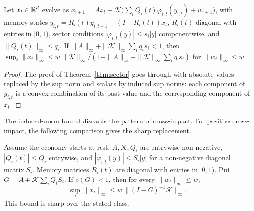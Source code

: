 \begin{proposition}\label{prop:multiasset}
Let $x_t\in\mathbb{R}^d$ evolve as $x_{t+1}=Ax_t+\mathcal K\bigl(\sum_iQ_i(t)\varphi_{i,t}(y_{i,t})+w_{t+1}\bigr)$, with memory states $y_{i,t}=R_i(t)y_{i,t-1}+(I-R_i(t))x_t$, $R_i(t)$ diagonal with entries in $[0,1)$, sector conditions $|\varphi_{i,t}(y)|\le s_i|y|$ componentwise, and $\|Q_i(t)\|_\infty\le\bar q_i$. If $\|A\|_\infty+\|\mathcal K\|_\infty\sum_i\bar q_is_i<1$, then $\sup_t\|x_t\|_\infty\le\bar w\,\|\mathcal K\|_\infty/(1-\|A\|_\infty-\|\mathcal K\|_\infty\sum_i\bar q_is_i)$ for $\|w_t\|_\infty\le\bar w$. \hfill\Proved
\end{proposition}

\begin{proof}
The proof of Theorem~\ref{thm:sector} goes through with absolute values replaced by the sup norm and scalars by induced sup norms: each component of $y_{i,t}$ is a convex combination of its past value and the corresponding component of $x_t$.
\end{proof}

The induced-norm bound discards the pattern of cross-impact. For positive cross-impact, the following comparison gives the sharp replacement.

\begin{proposition}\label{prop:multiasset_positive}
Assume the economy starts at rest, $A,\mathcal K,\overline Q_i$ are entrywise non-negative, $|Q_i(t)|\le\overline Q_i$ entrywise, and $|\varphi_{i,t}(y)|\le S_i|y|$ for a non-negative diagonal matrix $S_i$. Memory matrices $R_i(t)$ are diagonal with entries in $[0,1)$. Put $G=A+\mathcal K\sum_i\overline Q_i S_i$. If $\rho(G)<1$, then for every $\|w_t\|_\infty\le\bar w$,
\[
\sup_t\|x_t\|_\infty\le
\bar w\,\bigl\|(I-G)^{-1}\mathcal K\bigr\|_\infty.
\]
This bound is sharp over the stated class. \hfill\Proved
\end{proposition}


